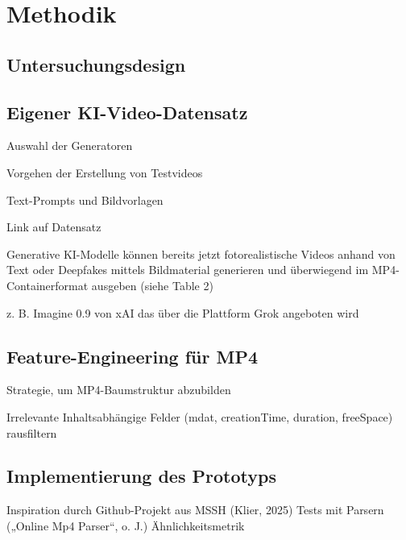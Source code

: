 \chapter{Methodik}


\section{Untersuchungsdesign}


\section{Eigener KI-Video-Datensatz}

Auswahl der Generatoren

Vorgehen der Erstellung von Testvideos

Text-Prompts und Bildvorlagen

Link auf Datensatz

Generative KI-Modelle können bereits jetzt fotorealistische Videos anhand von Text oder Deepfakes mittels Bildmaterial generieren und überwiegend im MP4-Containerformat ausgeben (siehe Table 2)

z. B. Imagine 0.9 von xAI das über die Plattform Grok angeboten wird





\section{Feature-Engineering für MP4}

Strategie, um MP4-Baumstruktur abzubilden

Irrelevante Inhaltsabhängige Felder (mdat, creationTime, duration, freeSpace) rausfiltern


\section{Implementierung des Prototyps}

Inspiration durch Github-Projekt aus MSSH (Klier, 2025)\cite{klier_github_2025}
Tests mit Parsern („Online Mp4 Parser“, o. J.)
Ähnlichkeitsmetrik
